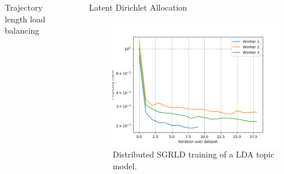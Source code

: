 \documentclass[final]{beamer}
\newlength{\sepwid}
\newlength{\onecolwid}
\newlength{\twocolwid}
\begin{document}
\begin{frame}[t]
\begin{columns}[t]
\begin{column}{\twocolwid}
\begin{columns}[t,totalwidth=\twocolwid]
\begin{column}{\onecolwid}
\begin{block}{Trajectory length load balancing}

\end{block}



\end{column} %

\end{columns} %


\end{column} %

\begin{column}{\sepwid}\end{column} %

\begin{column}{\onecolwid} %

\begin{block}{Latent Dirichlet Allocation}
  \begin{figure}
    \centering
    \includegraphics[width=0.8\linewidth]{poster-figures/perplexity-sgrld.png}
    \caption{Distributed SGRLD \cite{patterson2013stochastic} training of a LDA topic model.}
    \label{fig:perplexity-sgrld}
  \end{figure}
\end{block}


\end{column}
\end{columns}
\end{frame}
\end{document}
